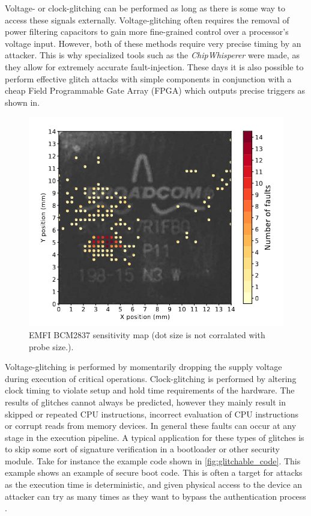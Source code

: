 Voltage- or clock-glitching can be performed as long as there is some way to access these signals externally. Voltage-glitching often requires the removal of power filtering capacitors to gain more fine-grained control over a processor's voltage input. However, both of these methods require very precise timing by an attacker. This is why specialized tools such as the \textit{ChipWhisperer}\cite{chipWhisperer} were made, as they allow for extremely accurate fault-injection. These days it is also possible to perform effective glitch attacks with simple components in conjunction with a cheap Field Programmable Gate Array (FPGA) which outputs precise triggers as shown in\cite{hole_in_soc}. 

\begin{figure}[h!]
    \centering
    \includegraphics[scale=0.5]{docs/images/emfi_error_map.png}
    \caption{EMFI BCM2837 sensitivity map (dot size is not corralated with probe size.)\cite{emfi_injection}.}
    \label{fig:emfi_map}
\end{figure}

Voltage-glitching is performed by momentarily dropping the supply voltage during execution of critical operations. Clock-glitching is performed by altering clock timing to violate setup and hold time requirements of the hardware\cite{intro_to_FI}. The results of glitches cannot always be predicted, however they mainly result in skipped or repeated CPU instructions, incorrect evaluation of CPU instructions or corrupt reads from memory devices\cite{intro_to_FI}. In general these faults can occur at any stage in the execution pipeline. A typical application for these types of glitches is to skip some sort of signature verification in a bootloader or other security module. Take for instance the example code shown in \autoref{fig:glitchable_code}. This example shows an example of secure boot code. This is often a target for attacks as the execution time is deterministic, and given physical access to the device an attacker can try as many times as they want to bypass the authentication process \cite{arm_presentation}. 


